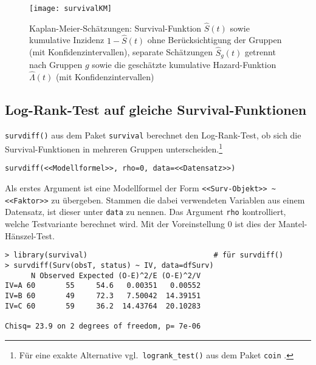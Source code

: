 \begin{figure}[!ht]
\centering
\texttt{[image: survivalKM]}
\vspace*{-1em}
\caption{Kaplan-Meier-Schätzungen: Survival-Funktion $\hat{S}(t)$ sowie kumulative Inzidenz $1-\hat{S}(t)$ ohne Berücksichtigung der Gruppen (mit Konfidenzintervallen), separate Schätzungen $\hat{S}_{g}(t)$ getrennt nach Gruppen $g$ sowie die geschätzte kumulative Hazard-Funktion $\hat{\Lambda}(t)$ (mit Konfidenzintervallen)}
\label{fig:survivalKM}
\end{figure}

\subsection{Log-Rank-Test auf gleiche Survival-Funktionen}


\lstinline!survdiff()! aus dem Paket \lstinline!survival! berechnet den Log-Rank-Test, ob sich die Survival-Funktionen in mehreren Gruppen unterscheiden.\footnote{Für eine exakte Alternative vgl.\ \lstinline!logrank_test()! aus dem Paket \lstinline!coin! \cite{Hothorn2008a}.}
\begin{lstlisting}
survdiff(<<Modellformel>>, rho=0, data=<<Datensatz>>)
\end{lstlisting}

Als erstes Argument ist eine Modellformel der Form \lstinline!<<Surv-Objekt>> ~ <<Faktor>>! zu übergeben. Stammen die dabei verwendeten Variablen aus einem Datensatz, ist dieser unter \lstinline!data! zu nennen. Das Argument \lstinline!rho! kontrolliert, welche Testvariante berechnet wird. Mit der Voreinstellung $0$ ist dies der Mantel-Hänszel-Test.
\begin{lstlisting}
> library(survival)                             # für survdiff()
> survdiff(Surv(obsT, status) ~ IV, data=dfSurv)
      N Observed Expected (O-E)^2/E (O-E)^2/V
IV=A 60       55     54.6   0.00351   0.00552
IV=B 60       49     72.3   7.50042  14.39151
IV=C 60       59     36.2  14.43764  20.10283

Chisq= 23.9 on 2 degrees of freedom, p= 7e-06
\end{lstlisting}


